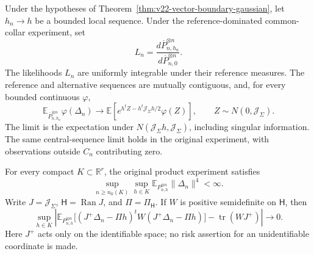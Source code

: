 \begin{proposition}
\label{prop:v34-tilting-moments}
Under the hypotheses of Theorem~\ref{thm:v22-vector-boundary-gaussian},
let \(h_n\to h\) be a bounded local sequence.  Under the reference-dominated
common-collar experiment, set
\[
 L_n=\frac{d\overline P_{n,h_n}^{\otimes n}}
          {d\overline P_{n,0}^{\otimes n}}.
\]
The likelihoods \(L_n\) are uniformly integrable under their reference
measures.  The reference and alternative sequences are mutually contiguous,
and, for every bounded continuous \(\varphi\),
\begin{equation}\label{eq:v34-direct-tilting}
 \mathbb E_{\overline P_{n,h_n}^{\otimes n}}\varphi(\Delta_n)
 \longrightarrow
 \mathbb E\!\left[
  e^{h^tZ-h^t\mathcal J_\Sigma h/2}\varphi(Z)\right],
 \qquad Z\sim N(0,\mathcal J_\Sigma).
\end{equation}
The limit is the expectation under
\(N(\mathcal J_\Sigma h,\mathcal J_\Sigma)\), including singular
information.  The same central-sequence limit holds in the original
experiment, with observations outside \(C_n\) contributing zero.

For every compact \(K\subset\mathbb R^r\), the original product experiment
satisfies
\begin{equation}\label{eq:v34-fourth-moment}
 \sup_{n\ge n_0(K)}\sup_{h\in K}
        \mathbb E_{P_{n,h}^{\otimes n}}\|\Delta_n\|^4<\infty.
\end{equation}
Write \(J=\mathcal J_\Sigma\), \(\mathsf H=\operatorname{Ran}J\), and
\(\Pi=\Pi_{\mathsf H}\).  If \(W\) is positive semidefinite on
\(\mathsf H\), then
\begin{equation}\label{eq:v34-quadratic-risk}
 \sup_{h\in K}\left|
 \mathbb E_{P_{n,h}^{\otimes n}}
  \bigl[(J^+\Delta_n-\Pi h)^tW(J^+\Delta_n-\Pi h)\bigr]
                 -\operatorname{tr}(WJ^+)\right|\longrightarrow0.
\end{equation}
Here \(J^+\) acts only on the identifiable space; no risk assertion for an
unidentifiable coordinate is made.
\end{proposition}

